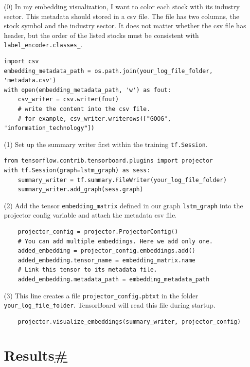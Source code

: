 (0) In my embedding visualization, I want to color each stock with its industry sector. This metadata should stored in a csv file. The file has two columns, the stock symbol and the industry sector. It does not matter whether the csv file has header, but the order of the listed stocks must be consistent with \texttt{label\_encoder.classes\_}.

\begin{verbatim}
import csv
embedding_metadata_path = os.path.join(your_log_file_folder, 'metadata.csv')
with open(embedding_metadata_path, 'w') as fout:
    csv_writer = csv.writer(fout)
    # write the content into the csv file.
    # for example, csv_writer.writerows(["GOOG", "information_technology"])
\end{verbatim}

(1) Set up the summary writer first within the training \texttt{tf.Session}.

\begin{verbatim}
from tensorflow.contrib.tensorboard.plugins import projector
with tf.Session(graph=lstm_graph) as sess:
    summary_writer = tf.summary.FileWriter(your_log_file_folder)
    summary_writer.add_graph(sess.graph)
\end{verbatim}

(2) Add the tensor \texttt{embedding\_matrix} defined in our graph \texttt{lstm\_graph} into the projector config variable and attach the metadata csv file.

\begin{verbatim}
    projector_config = projector.ProjectorConfig()
    # You can add multiple embeddings. Here we add only one.
    added_embedding = projector_config.embeddings.add()
    added_embedding.tensor_name = embedding_matrix.name
    # Link this tensor to its metadata file.
    added_embedding.metadata_path = embedding_metadata_path
\end{verbatim}

(3) This line creates a file \texttt{projector\_config.pbtxt} in the folder \texttt{your\_log\_file\_folder}. TensorBoard will read this file during startup.

\begin{verbatim}
    projector.visualize_embeddings(summary_writer, projector_config)
\end{verbatim}

\section{\texorpdfstring{Results\hyperref[results]{\#}}{Results\#}}\label{results}

